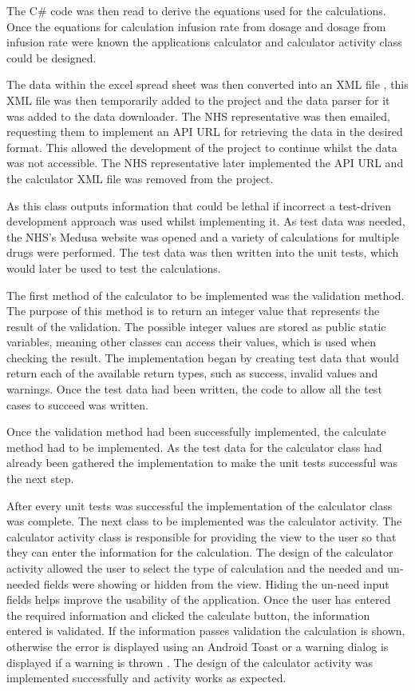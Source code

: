 The C\# code was then read to derive the equations used for the calculations. Once the equations for calculation infusion rate from dosage and dosage from infusion rate were known the applications calculator and calculator activity class could be designed.

The data within the excel spread sheet was then converted into an XML file \cite{xml}, this XML file was then temporarily added to the project and the data parser for it was added to the data downloader. The NHS representative was then emailed, requesting them to implement an API URL for retrieving the data in the desired format. This allowed the development of the project to continue whilst the data was not accessible. The NHS representative later implemented the API URL and the calculator XML file was removed from the project.

As this class outputs information that could be lethal if incorrect a test-driven development \cite{tdd} approach was used whilst implementing it. As test data was needed, the NHS’s Medusa website \cite{medusa} was opened and a variety of calculations for multiple drugs were performed. The test data was then written into the unit tests, which would later be used to test the calculations.

The first method of the calculator to be implemented was the validation method. The purpose of this method is to return an integer value that represents the result of the validation. The possible integer values are stored as public static variables, meaning other classes can access their values, which is used when checking the result. The implementation began by creating test data that would return each of the available return types, such as success, invalid values and warnings. Once the test data had been written, the code to allow all the test cases to succeed was written. 

Once the validation method had been successfully implemented, the calculate method had to be implemented. As the test data for the calculator class had already been gathered the implementation to make the unit tests successful was the next step.

After every unit tests was successful the implementation of the calculator class was complete. The next class to be implemented was the calculator activity. The calculator activity class is responsible for providing the view to the user so that they can enter the information for the calculation. The design of the calculator activity allowed the user to select the type of calculation and the needed and un-needed fields were showing or hidden from the view. Hiding the un-need input fields helps improve the usability of the application. Once the user has entered the required information and clicked the calculate button, the information entered is validated. If the information passes validation the calculation is shown, otherwise the error is displayed using an Android Toast or a warning dialog is displayed if a warning is thrown \cite{dialog}. The design of the calculator activity was implemented successfully and activity works as expected.

